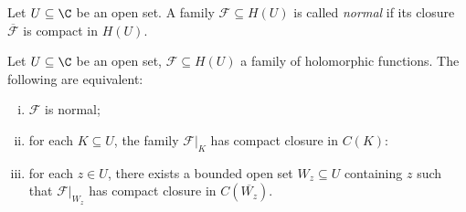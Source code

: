 \documentclass[10pt]{mypackage}
\begin{document}
\begin{definition}
  Let $U\subseteq \C$ be an open set. A family $\mathcal{F}\subseteq H\left( U \right)$ is called \textit{normal} if its closure $ \overline{\mathcal{F}} $ is compact in $H(U)$.
\end{definition}
\begin{theorem}
  Let $U\subseteq \C$ be an open set, $\mathcal{F}\subseteq H(U)$ a family of holomorphic functions. The following are equivalent:
  \begin{enumerate}[(i)]
    \item $\mathcal{F}$ is normal;
    \item for each $K\subseteq U$, the family $\mathcal{F}|_{K}$ has compact closure in $C(K)$:
    \item for each $z\in U$, there exists a bounded open set $W_z\subseteq U$ containing $z$ such that $\mathcal{F}|_{W_z}$ has compact closure in $C\left( \overline{W_z} \right)$.
  \end{enumerate}
\end{theorem}
\end{document}
